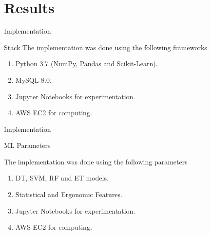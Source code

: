 \section{Results}
\frame{\sectionpage}



\begin{frame}{Implementation}
    \begin{alertblock}{Stack}
        The implementation was done using the following frameworks
        \begin{enumerate}
            \item Python 3.7 (NumPy, Pandas and Scikit-Learn).
            \item MySQL 8.0.
            \item Jupyter Notebooks for experimentation.
            \item AWS EC2 for computing.
        \end{enumerate}
    \end{alertblock}
\end{frame}

\begin{frame}{Implementation}
    \begin{alertblock}{ML Parameters}

        The implementation was done using the following parameters
        \begin{enumerate}
            \item DT, SVM, RF and ET models.
            \item Statistical and Ergonomic Features.
            \item Jupyter Notebooks for experimentation.
            \item AWS EC2 for computing.
        \end{enumerate}
    \end{alertblock}
\end{frame}


